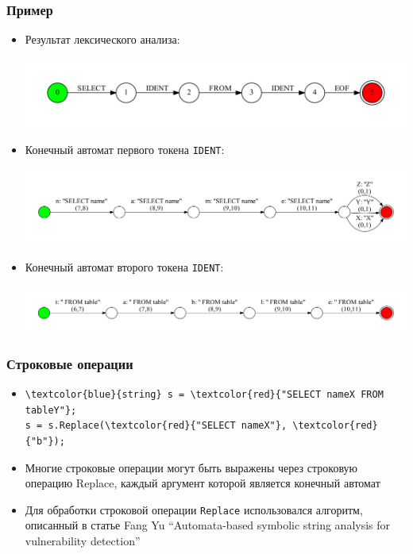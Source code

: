 \documentclass{beamer}
\begin{document}
\begin{frame}[fragile]
\transwipe[direction=90]
\frametitle{Пример}
\begin{itemize}
\item Результат лексического анализа:
	\begin{center}
        {\includegraphics[width=1.0\linewidth]{tsql_test_appr}}
    \end{center}
		
\item Конечный автомат первого токена \verb|IDENT|:
	\begin{center}
        {\includegraphics[width=1.0\linewidth]{tsql_ident_1}}
    \end{center}

\item Конечный автомат второго токена \verb|IDENT|:
	\begin{center}
        {\includegraphics[width=1.0\linewidth]{tsql_ident_2}}
    \end{center}
\end{itemize}
\end{frame}


\begin{frame}[fragile]
\transwipe[direction=90]
\frametitle{Строковые операции}
\begin{itemize}	
\item 
	\begin{Verbatim}[commandchars=\\\{\}]
\textcolor{blue}{string} s = \textcolor{red}{"SELECT nameX FROM tableY"};
s = s.Replace(\textcolor{red}{"SELECT nameX"}, \textcolor{red}{"b"});
	\end{Verbatim}	

\item Многие строковые операции могут быть выражены через строковую операцию Replace, каждый аргумент которой является конечный автомат

\item Для обработки строковой операции \verb|Replace| использовался алгоритм, описанный в статье Fang Yu  ``Automata-based symbolic string analysis for vulnerability detection''
\end{itemize}
\end{frame}
\end{document}
